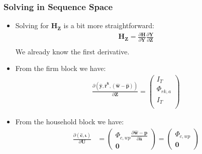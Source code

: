 \documentclass[english,xcolor=svgnames]{beamer}
\begin{document}
\begin{frame}
    \frametitle{Solving in Sequence Space}
		\begin{itemize}
			\item Solving for $\mathbf{H}_{\mathbf{Z}}$ is a bit more straightforward:
			\begin{align*}
				\mathbf{H}_{\mathbf{Z}} = \frac{\partial \mathbf{H}}{\partial \mathbf{Y}}\frac{\partial \mathbf{Y}}{\partial \mathbf{Z}} \\
			\end{align*}
			We already know the first derivative.
			\item From the firm block we have:
			\begin{align*}
				\frac{\partial (\mathbf{\hat{y}},\mathbf{\hat{r}^k},\mathbf{(\hat{w}-\hat{p})})}{\partial \mathbf{Z}} = \begin{pmatrix}
					I_T  \\
					\Phi_{rk,a}  \\
					I_T  \\
				\end{pmatrix}
			\end{align*}
			\item From the household block we have:
			\begin{align*}
				\frac{\partial (\mathbf{\hat{c}},\mathbf{\iota})}{\partial \mathbf{U}} &= \begin{pmatrix}
					\Phi_{c,wp}\frac{\partial\mathbf{\hat{w}-\hat{p}}}{\partial \mathbf{\hat{a}} } \\ \mathbf{0} 
				\end{pmatrix} = \begin{pmatrix}
					\Phi_{c,wp} \\ \mathbf{0} 
				\end{pmatrix}
			\end{align*}
		\end{itemize}
\end{frame}
\end{document}
